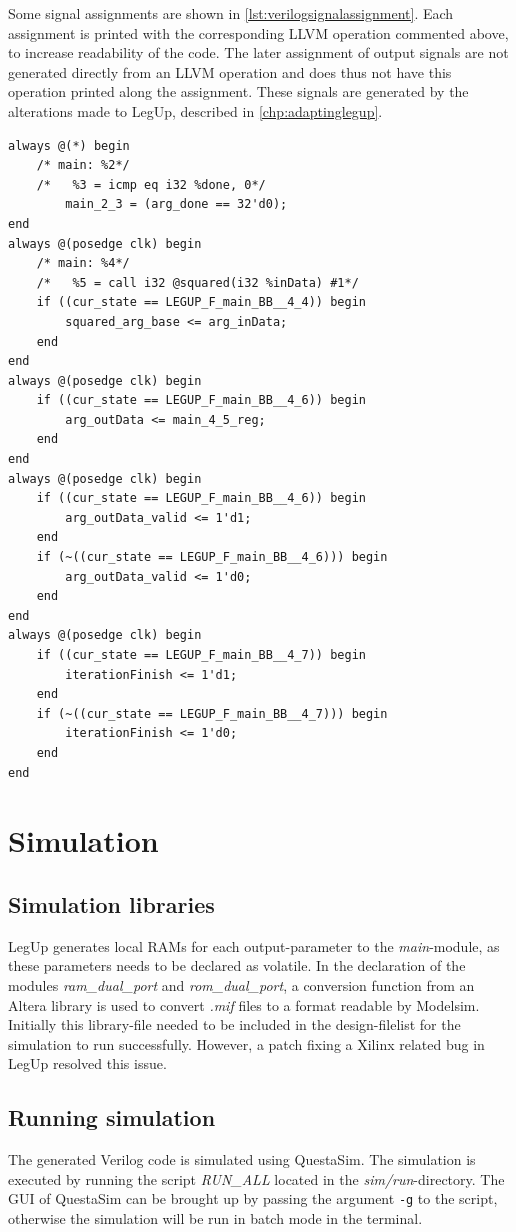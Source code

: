 Some signal assignments are shown in \cref{lst:verilogsignalassignment}. Each assignment is printed with the corresponding LLVM operation commented above, to increase readability of the code. The later assignment of output signals are not generated directly from an LLVM operation and does thus not have this operation printed along the assignment. These signals are generated by the alterations made to LegUp, described in \cref{chp:adaptinglegup}.
\begin{lstlisting}[caption={Verilog FSM},label=lst:verilogsignalassignment]
always @(*) begin
	/* main: %2*/
	/*   %3 = icmp eq i32 %done, 0*/
		main_2_3 = (arg_done == 32'd0);
end
always @(posedge clk) begin
	/* main: %4*/
	/*   %5 = call i32 @squared(i32 %inData) #1*/
	if ((cur_state == LEGUP_F_main_BB__4_4)) begin
		squared_arg_base <= arg_inData;
	end
end
always @(posedge clk) begin
	if ((cur_state == LEGUP_F_main_BB__4_6)) begin
		arg_outData <= main_4_5_reg;
	end
end
always @(posedge clk) begin
	if ((cur_state == LEGUP_F_main_BB__4_6)) begin
		arg_outData_valid <= 1'd1;
	end
	if (~((cur_state == LEGUP_F_main_BB__4_6))) begin
		arg_outData_valid <= 1'd0;
	end
end
always @(posedge clk) begin
	if ((cur_state == LEGUP_F_main_BB__4_7)) begin
		iterationFinish <= 1'd1;
	end
	if (~((cur_state == LEGUP_F_main_BB__4_7))) begin
		iterationFinish <= 1'd0;
	end
end
\end{lstlisting}

\section{Simulation}
\subsection{Simulation libraries}

LegUp generates local RAMs for each output-parameter to the \textit{main}-module, as these parameters needs to be declared as volatile. In the declaration of the modules \textit{ram\_dual\_port} and \textit{rom\_dual\_port}, a conversion function from an Altera library is used to convert \textit{.mif} files to a format readable by Modelsim. Initially this library-file needed to be included in the design-filelist for the simulation to run successfully. However, a patch fixing a Xilinx related bug in LegUp \cite{legupxilinx} resolved this issue.

\subsection{Running simulation}
The generated Verilog code is simulated using QuestaSim. The simulation is executed by running the script \textit{RUN\_ALL} located in the \textit{sim/run}-directory. The GUI of QuestaSim can be brought up by passing the argument \verb!-g! to the script, otherwise the simulation will be run in batch mode in the terminal.

